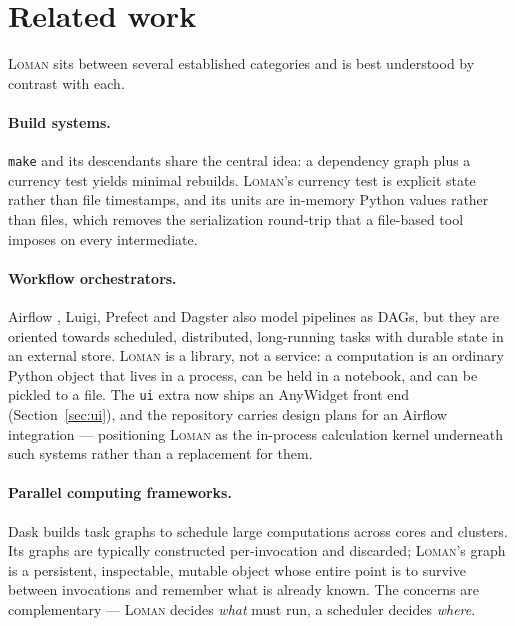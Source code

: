 \documentclass[11pt,a4paper]{article}
\newcommand{\loman}{\textsc{Loman}}
\newcommand{\code}[1]{\texttt{#1}}
\begin{document}
\section{Related work}\label{sec:related}

\loman{} sits between several established categories and is best understood by
contrast with each.

\paragraph{Build systems.} \code{make} \cite{make} and its descendants share
the central idea: a dependency graph plus a currency test yields minimal
rebuilds. \loman{}'s currency test is explicit state rather than file
timestamps, and its units are in-memory Python values rather than files, which
removes the serialization round-trip that a file-based tool imposes on every
intermediate.

\paragraph{Workflow orchestrators.} Airflow \cite{airflow}, Luigi, Prefect and
Dagster also model pipelines as DAGs, but they are oriented towards scheduled,
distributed, long-running tasks with durable state in an external store.
\loman{} is a library, not a service: a computation is an ordinary Python
object that lives in a process, can be held in a notebook, and can be pickled
to a file. The \code{ui} extra now ships an AnyWidget front end
(Section~\ref{sec:ui}), and the repository carries design plans for an Airflow
integration --- positioning \loman{} as the in-process calculation kernel
underneath such systems rather than a replacement for them.

\paragraph{Parallel computing frameworks.} Dask \cite{dask} builds task graphs
to schedule large computations across cores and clusters. Its graphs are
typically constructed per-invocation and discarded; \loman{}'s graph is a
persistent, inspectable, mutable object whose entire point is to survive
between invocations and remember what is already known. The concerns are
complementary --- \loman{} decides \emph{what} must run, a scheduler decides
\emph{where}.
\end{document}
